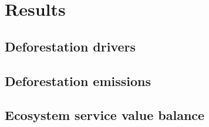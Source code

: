 \section{Results}
\label{sec:result}

\subsection{Deforestation drivers}
\subsection{Deforestation emissions}
\subsection{Ecosystem service value balance}
